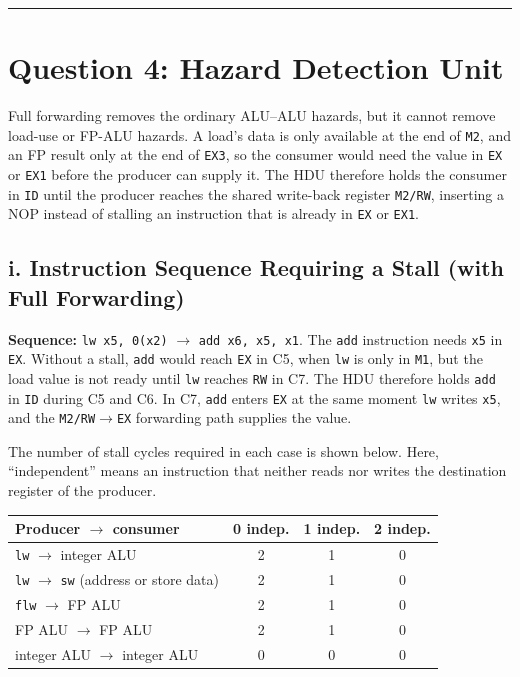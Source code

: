 \documentclass[11pt, a4paper]{article}
\begin{document}
\vspace{8pt}
\hrule
\vspace{8pt}

\section*{\textcolor{accent}{Question 4: Hazard Detection Unit}}

Full forwarding removes the ordinary ALU--ALU hazards, but it cannot remove load-use or FP-ALU hazards. A load's data is only available at the end of \texttt{M2}, and an FP result only at the end of \texttt{EX3}, so the consumer would need the value in \texttt{EX} or \texttt{EX1} before the producer can supply it. The HDU therefore holds the consumer in \texttt{ID} until the producer reaches the shared write-back register \texttt{M2/RW}, inserting a NOP instead of stalling an instruction that is already in \texttt{EX} or \texttt{EX1}.

\subsection*{i. Instruction Sequence Requiring a Stall (with Full Forwarding)}

\textbf{Sequence:} \texttt{lw x5, 0(x2)} $\rightarrow$ \texttt{add x6, x5, x1}. The \texttt{add} instruction needs \texttt{x5} in \texttt{EX}. Without a stall, \texttt{add} would reach \texttt{EX} in C5, when \texttt{lw} is only in \texttt{M1}, but the load value is not ready until \texttt{lw} reaches \texttt{RW} in C7. The HDU therefore holds \texttt{add} in \texttt{ID} during C5 and C6. In C7, \texttt{add} enters \texttt{EX} at the same moment \texttt{lw} writes \texttt{x5}, and the \texttt{M2/RW}$\rightarrow$\texttt{EX} forwarding path supplies the value.


The number of stall cycles required in each case is shown below. Here, ``independent'' means an instruction that neither reads nor writes the destination register of the producer.

\begin{center}
\small
\begin{tabular}{@{}lccc@{}}
\toprule
\textbf{Producer $\rightarrow$ consumer} & \textbf{0 indep.} & \textbf{1 indep.} & \textbf{2 indep.} \\
\midrule
\texttt{lw} $\rightarrow$ integer ALU & 2 & 1 & 0 \\
\texttt{lw} $\rightarrow$ \texttt{sw} (address or store data) & 2 & 1 & 0 \\
\texttt{flw} $\rightarrow$ FP ALU & 2 & 1 & 0 \\
FP ALU $\rightarrow$ FP ALU & 2 & 1 & 0 \\
integer ALU $\rightarrow$ integer ALU & 0 & 0 & 0 \\
\bottomrule
\end{tabular}
\end{center}
\end{document}
